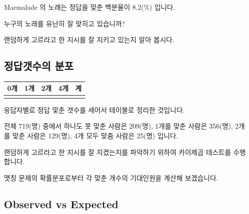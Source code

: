 \documentclass[
]{book}
\begin{document}
Marmalade 의 노래는 정답을 맞춘 백분율이 8.2(\%) 입니다.

누구의 노래를 유난히 잘 맞히고 있습니까?

랜덤하게 고르라고 한 지시를 잘 지키고 있는지 알아 봅시다.

\subsection{정답갯수의 분포}\label{uxc815uxb2f5uxac2fuxc218uxc758-uxbd84uxd3ec}

\begin{longtable}[]{@{}
  >{\centering\arraybackslash}p{}
  >{\centering\arraybackslash}p{}
  >{\centering\arraybackslash}p{}
  >{\centering\arraybackslash}p{}
  >{\centering\arraybackslash}p{}@{}}
\toprule\noalign{}
\begin{minipage}[b]{\linewidth}\centering
0개
\end{minipage} & \begin{minipage}[b]{\linewidth}\centering
1개
\end{minipage} & \begin{minipage}[b]{\linewidth}\centering
2개
\end{minipage} & \begin{minipage}[b]{\linewidth}\centering
4개
\end{minipage} & \begin{minipage}[b]{\linewidth}\centering
계
\end{minipage} \\
\midrule\noalign{}
\endhead
\bottomrule\noalign{}
\endlastfoot
209 & 356 & 129 & 25 & 719 \\
\end{longtable}

응답자별로 정답 맟춘 갯수를 세어서 테이블로 정리한 것입니다.

전체 719(명) 중에서 하나도 못 맞춘 사람은 209(명), 1개를 맞춘 사람은 356(명), 2개를 맞춘 사람은 129(명), 4개 모두 맞춤 사람은 25(명) 입니다.

랜덤하게 고르라고 한 지시를 잘 지켰는지를 파악하기 위하여 카이제곱 테스트를 수행합니다.

맷칭 문제의 확률분포로부터 각 맞춘 개수의 기대인원을 계산해 보겠습니다.

\subsection{Observed vs Expected}\label{observed-vs-expected}
\end{document}
